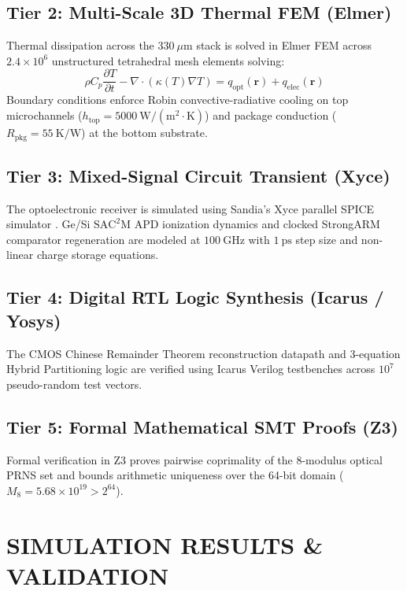 \documentclass[journal]{IEEEtran}
\begin{document}
\subsection{Tier 2: Multi-Scale 3D Thermal FEM (Elmer)}
Thermal dissipation across the $330~\mu\mathrm{m}$ stack is solved in Elmer FEM \cite{Raback2013} across $2.4 \times 10^6$ unstructured tetrahedral mesh elements solving:
\begin{equation}
    \rho C_p \frac{\partial T}{\partial t} - \nabla \cdot (\kappa(T) \nabla T) = q_{\mathrm{opt}}(\mathbf{r}) + q_{\mathrm{elec}}(\mathbf{r})
\end{equation}
Boundary conditions enforce Robin convective-radiative cooling on top microchannels ($h_{\mathrm{top}} = 5000~\mathrm{W/(m^2\cdot K)}$) and package conduction ($R_{\mathrm{pkg}} = 55~\mathrm{K/W}$) at the bottom substrate.

\subsection{Tier 3: Mixed-Signal Circuit Transient (Xyce)}
The optoelectronic receiver is simulated using Sandia's Xyce parallel SPICE simulator \cite{Hutchinson2002}. Ge/Si $\mathrm{SAC^2M}$ APD ionization dynamics and clocked StrongARM comparator regeneration \cite{Razavi2015} are modeled at $100~\mathrm{GHz}$ with $1~\mathrm{ps}$ step size and non-linear charge storage equations.

\subsection{Tier 4: Digital RTL Logic Synthesis (Icarus / Yosys)}
The CMOS Chinese Remainder Theorem reconstruction datapath and 3-equation Hybrid Partitioning logic are verified using Icarus Verilog testbenches across $10^7$ pseudo-random test vectors.

\subsection{Tier 5: Formal Mathematical SMT Proofs (Z3)}
Formal verification in Z3 \cite{DeMoura2008} proves pairwise coprimality of the 8-modulus optical PRNS set and bounds arithmetic uniqueness over the 64-bit domain ($M_8 = 5.68 \times 10^{19} > 2^{64}$).

\section{SIMULATION RESULTS \& VALIDATION}
\end{document}
